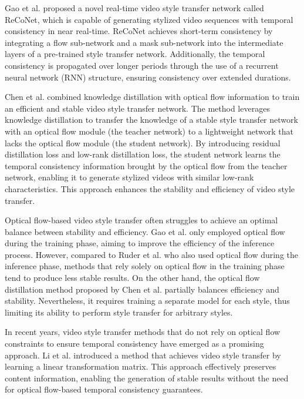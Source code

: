\documentclass[preprint,12pt]{elsarticle}
\begin{document}
Gao et al.\citep{99gao2019reconet} proposed a novel real-time video style transfer network called ReCoNet, which is capable of generating stylized video sequences with temporal consistency in near real-time. ReCoNet achieves short-term consistency by integrating a flow sub-network and a mask sub-network into the intermediate layers of a pre-trained style transfer network. Additionally, the temporal consistency is propagated over longer periods through the use of a recurrent neural network (RNN) structure, ensuring consistency over extended durations.

Chen et al.\citep{100chen2020optical} combined knowledge distillation with optical flow information to train an efficient and stable video style transfer network. The method leverages knowledge distillation to transfer the knowledge of a stable style transfer network with an optical flow module (the teacher network) to a lightweight network that lacks the optical flow module (the student network). By introducing residual distillation loss and low-rank distillation loss, the student network learns the temporal consistency information brought by the optical flow from the teacher network, enabling it to generate stylized videos with similar low-rank characteristics. This approach enhances the stability and efficiency of video style transfer.

Optical flow-based video style transfer often struggles to achieve an optimal balance between stability and efficiency. Gao et al.\citep{99gao2019reconet} only employed optical flow during the training phase, aiming to improve the efficiency of the inference process. However, compared to Ruder et al.\citep{98ruder2016artistic}  who also used optical flow during the inference phase, methods that rely solely on optical flow in the training phase tend to produce less stable results. On the other hand, the optical flow distillation method proposed by Chen et al.\citep{100chen2020optical} partially balances efficiency and stability. Nevertheless, it requires training a separate model for each style, thus limiting its ability to perform style transfer for arbitrary styles.

In recent years, video style transfer methods that do not rely on optical flow constraints to ensure temporal consistency have emerged as a promising approach. Li et al.\citep{101li2019learning} introduced a method that achieves video style transfer by learning a linear transformation matrix. This approach effectively preserves content information, enabling the generation of stable results without the need for optical flow-based temporal consistency guarantees.
\end{document}
